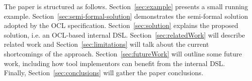 \documentclass{llncs}
\begin{document}


The paper is structured as follows. Section~\ref{sec:example} presents a small running example. Section~\ref{sec:semi-formal-solution} demonstrates the semi-formal solution adopted by the OCL specification. Section~\ref{sec:solution} explains the proposed solution, i.e. an OCL-based internal DSL. Section~\ref{sec:relatedWork} will describe related work and Section~\ref{sec:limitations} will talk about the current shortcomings of the approach. Section~\ref{sec:futureWork} will outline some future work, including how tool implementors can benefit from the internal DSL. Finally, Section~\ref{sec:conclusions} will gather the paper conclusions.



\end{document}
